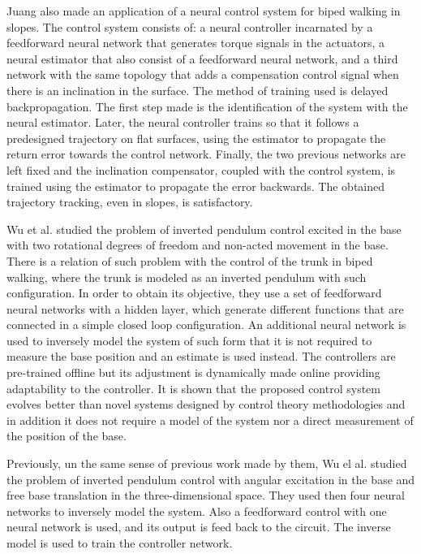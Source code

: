 Juang \cite{Juang01Intelligent} also made an application of a neural
control system for biped walking in slopes. The control system
consists of: a neural controller incarnated by a feedforward neural
network that generates torque signals in the actuators, a neural
estimator that also consist of a feedforward neural network, and a
third network with the same topology that adds a compensation control
signal when there is an inclination in the surface. The method of
training used is delayed backpropagation. The first step made is the
identification of the system with the neural estimator. Later, the
neural controller trains so that it follows a predesigned trajectory
on flat surfaces, using the estimator to propagate the return error
towards the control network. Finally, the two previous networks are
left fixed and the inclination compensator, coupled with the control
system, is trained using the estimator to propagate the error
backwards. The obtained trajectory tracking, even in slopes, is
satisfactory.


Wu et al. \cite{Wu02Neural-based} studied the problem of inverted
pendulum control excited in the base with two rotational degrees of
freedom and non-acted movement in the base. There is a relation of
such problem with the control of the trunk in biped walking, where the
trunk is modeled as an inverted pendulum with such configuration. In
order to obtain its objective, they use a set of feedforward neural
networks with a hidden layer, which generate different functions that
are connected in a simple closed loop configuration. An additional
neural network is used to inversely model the system of such form that
it is not required to measure the base position and an estimate is
used instead. The controllers are pre-trained offline but its
adjustment is dynamically made online providing adaptability to the
controller. It is shown that the proposed control system evolves
better than novel systems designed by control theory methodologies and
in addition it does not require a model of the system nor a direct
measurement of the position of the base.


Previously, un the same sense of previous work made by them, Wu el
al. \cite{Wu02Neural} studied the problem of inverted pendulum control
with angular excitation in the base and free base translation in the
three-dimensional space. They used then four neural networks to
inversely model the system. Also a feedforward control with one neural
network is used, and its output is feed back to the circuit. The
inverse model is used to train the controller network.


